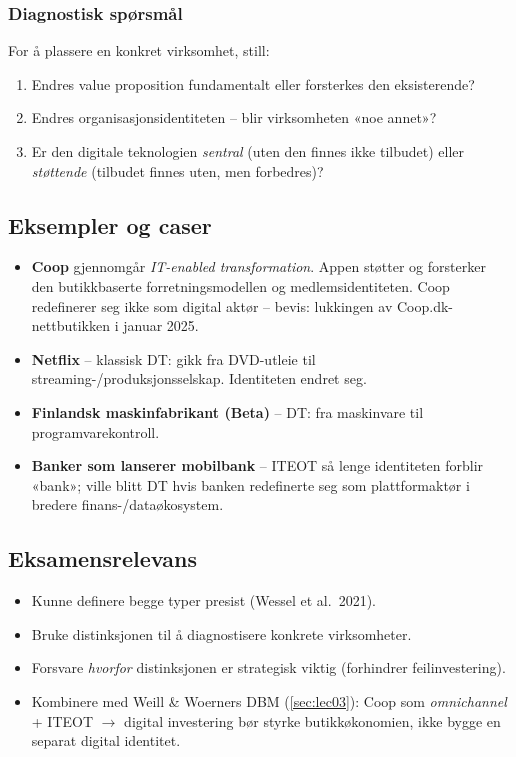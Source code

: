 \subsubsection*{Diagnostisk spørsmål}
For å plassere en konkret virksomhet, still:
\begin{enumerate}
  \item Endres value proposition fundamentalt eller forsterkes den eksisterende?
  \item Endres organisasjonsidentiteten -- blir virksomheten «noe annet»?
  \item Er den digitale teknologien \emph{sentral} (uten den finnes ikke
    tilbudet) eller \emph{støttende} (tilbudet finnes uten, men forbedres)?
\end{enumerate}

\subsection{Eksempler og caser}
\begin{itemize}
  \item \textbf{Coop} gjennomgår \emph{IT-enabled transformation}. Appen
    støtter og forsterker den butikkbaserte forretningsmodellen og
    medlemsidentiteten. Coop redefinerer seg ikke som digital aktør --
    bevis: lukkingen av Coop.dk-nettbutikken i januar 2025.
  \item \textbf{Netflix} -- klassisk DT: gikk fra DVD-utleie til
    streaming-/produksjonsselskap. Identiteten endret seg.
  \item \textbf{Finlandsk maskinfabrikant (Beta)} -- DT: fra maskinvare til
    programvarekontroll.
  \item \textbf{Banker som lanserer mobilbank} -- ITEOT så lenge identiteten
    forblir «bank»; ville blitt DT hvis banken redefinerte seg som
    plattformaktør i bredere finans-/dataøkosystem.
\end{itemize}

\subsection{Eksamensrelevans}
\begin{itemize}
  \item Kunne definere begge typer presist (Wessel et al.\ 2021).
  \item Bruke distinksjonen til å diagnostisere konkrete virksomheter.
  \item Forsvare \emph{hvorfor} distinksjonen er strategisk viktig (forhindrer
    feilinvestering).
  \item Kombinere med Weill \& Woerners DBM (\autoref{sec:lec03}): Coop som
    \emph{omnichannel} + ITEOT $\rightarrow$ digital investering bør styrke
    butikkøkonomien, ikke bygge en separat digital identitet.
\end{itemize}
